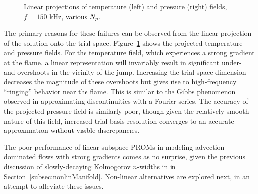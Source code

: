\begin{figure}
\begin{minipage}{0.49\linewidth}
    \end{minipage}
    \caption{\label{fig:flameLinearProj}Linear projections of temperature (left) and pressure (right) fields, $f = 150$ kHz, various $N_p$.}
\end{figure}

The primary reasons for these failures can be observed from the linear projection of the solution onto the trial space. Figure~\ref{fig:flameLinearProj} shows the projected temperature and pressure fields. For the temperature field, which experiences a strong gradient at the flame, a linear representation will invariably result in significant under- and overshoots in the vicinity of the jump. Increasing the trial space dimension decreases the magnitude of these overshoots but gives rise to high-frequency ``ringing'' behavior near the flame. This is similar to the Gibbs phenomenon observed in approximating discontinuities with a Fourier series. The accuracy of the projected pressure field is similarly poor, though given the relatively smooth nature of this field, increased trial basis resolution converges to an accurate approximation without visible discrepancies.

The poor performance of linear subspace PROMs in modeling advection-dominated flows with strong gradients comes as no surprise, given the previous discussion of slowly-decaying Kolmogorov $n$-widths in in Section~\ref{subsec:nonlinManifold}. Non-linear alternatives are explored next, in an attempt to alleviate these issues.